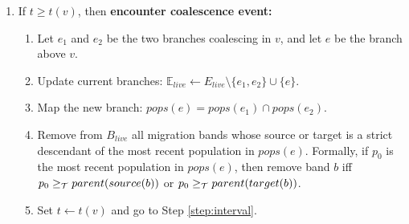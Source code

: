 \documentclass[11pt]{article}
\newcommand{\E}{\mathbb{E}}
\newcommand{\Tr}{\mathcal{T}}
\newcommand{\1}{\mathbbm{1}}
\begin{document}
\begin{enumerate}
  \item If $t \geq t(v)$, then \textbf{encounter coalescence event:}
  \begin{enumerate}
    \item \label{step:coal} Let $e_1$ and $e_2$ be the two branches coalescing in $v$, and let $e$ be the branch above $v$.
    \item Update current branches: $\E_{live}\leftarrow E_{live}\setminus\{e_1,e_2\}\cup\{e\}$.
    \item \label{step:coal_mapping} Map the new branch: $pops(e) = pops(e_1)\cap pops(e_2)$.
    \item \label{step:ub_coal} Remove from $B_{live}$ all migration bands whose source or target is a strict descendant of the most recent population in $pops(e)$.
    Formally, if $p_0$ is the most recent population in $pops(e)$, then remove band $b$ iff $p_0 \anc parent(source(b))$ or $p_0\anc parent(target(b))$.
    \item Set $t\leftarrow t(v)$ and go to Step \ref{step:interval}.
  \end{enumerate}
  
\end{enumerate}
\end{document}
